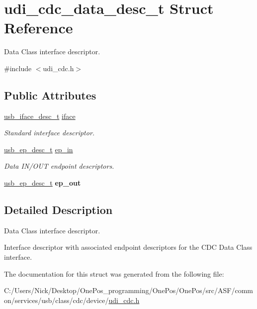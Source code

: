 \hypertarget{structudi__cdc__data__desc__t}{\section{udi\-\_\-cdc\-\_\-data\-\_\-desc\-\_\-t Struct Reference}
\label{structudi__cdc__data__desc__t}
}


Data Class interface descriptor.  




{\ttfamily \#include $<$udi\-\_\-cdc.\-h$>$}

\subsection*{Public Attributes}
\begin{DoxyCompactItemize}
\item 
\hypertarget{structudi__cdc__data__desc__t_a1c46d591be0f1fc12b6b79b43143c903}{\hyperlink{structusb__iface__desc__t}{usb\-\_\-iface\-\_\-desc\-\_\-t} \hyperlink{structudi__cdc__data__desc__t_a1c46d591be0f1fc12b6b79b43143c903}{iface}}\label{structudi__cdc__data__desc__t_a1c46d591be0f1fc12b6b79b43143c903}

\begin{DoxyCompactList}\small\item\em Standard interface descriptor. \end{DoxyCompactList}\item 
\hypertarget{structudi__cdc__data__desc__t_af219d67a67805d90e0c5064dd4ab2c29}{\hyperlink{structusb__ep__desc__t}{usb\-\_\-ep\-\_\-desc\-\_\-t} \hyperlink{structudi__cdc__data__desc__t_af219d67a67805d90e0c5064dd4ab2c29}{ep\-\_\-in}}\label{structudi__cdc__data__desc__t_af219d67a67805d90e0c5064dd4ab2c29}

\begin{DoxyCompactList}\small\item\em Data I\-N/\-O\-U\-T endpoint descriptors. \end{DoxyCompactList}\item 
\hypertarget{structudi__cdc__data__desc__t_a0be1a0edc207babda9677cbf34ac29c4}{\hyperlink{structusb__ep__desc__t}{usb\-\_\-ep\-\_\-desc\-\_\-t} {\bfseries ep\-\_\-out}}\label{structudi__cdc__data__desc__t_a0be1a0edc207babda9677cbf34ac29c4}

\end{DoxyCompactItemize}


\subsection{Detailed Description}
Data Class interface descriptor. 

Interface descriptor with associated endpoint descriptors for the C\-D\-C Data Class interface. 

The documentation for this struct was generated from the following file\-:\begin{DoxyCompactItemize}
\item 
C\-:/\-Users/\-Nick/\-Desktop/\-One\-Pos\-\_\-programming/\-One\-Pos/\-One\-Pos/src/\-A\-S\-F/common/services/usb/class/cdc/device/\hyperlink{udi__cdc_8h}{udi\-\_\-cdc.\-h}\end{DoxyCompactItemize}
